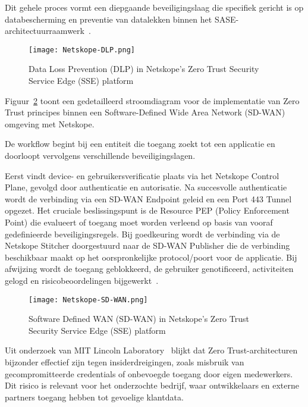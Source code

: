 \vspace{2ex}

Dit gehele proces vormt een diepgaande beveiligingslaag die specifiek gericht is op databescherming en preventie van datalekken binnen het SASE-architectuurraamwerk~\autocite{Netskope2024}.
\begin{figure}[h!]
  \centering
  \texttt{[image: Netskope-DLP.png]}
  \caption[Netskope Data Loss Prevention (DLP)]{Data Loss Prevention (DLP) in Netskope's Zero Trust Security Service Edge (SSE) platform~\autocite{Netskope2024}}
  \label{fig:Netskope-DLP}
\end{figure}

Figuur~\ref{fig:Netskope-SD-WAN} toont een gedetailleerd stroomdiagram voor de implementatie van Zero Trust principes binnen een Software-Defined Wide Area Network (SD-WAN) omgeving met Netskope. 

\vspace{2ex}

De workflow begint bij een entiteit die toegang zoekt tot een applicatie en doorloopt vervolgens verschillende beveiligingslagen. 

\vspace{2ex}

Eerst vindt device- en gebruikersverificatie plaats via het Netskope Control Plane, gevolgd door authenticatie en autorisatie. Na succesvolle authenticatie wordt de verbinding via een SD-WAN Endpoint geleid en een Port 443 Tunnel opgezet. Het cruciale beslissingspunt is de Resource PEP (Policy Enforcement Point) die evalueert of toegang moet worden verleend op basis van vooraf gedefinieerde beveiligingsregels. Bij goedkeuring wordt de verbinding via de Netskope Stitcher doorgestuurd naar de SD-WAN Publisher die de verbinding beschikbaar maakt op het oorspronkelijke protocol/poort voor de applicatie. Bij afwijzing wordt de toegang geblokkeerd, de gebruiker genotificeerd, activiteiten gelogd en risicobeoordelingen bijgewerkt~\autocite{Netskope2024}.
\begin{figure}[h!]
  \centering
  \texttt{[image: Netskope-SD-WAN.png]}
  \caption[Netskope Software Defined WAN (SD-WAN)]{Software Defined WAN (SD-WAN) in Netskope's Zero Trust Security Service Edge (SSE) platform~\autocite{Netskope2024}}
  \label{fig:Netskope-SD-WAN}
\end{figure}

\vspace{2ex}

Uit onderzoek van MIT Lincoln Laboratory~\autocite{MIT2022} blijkt dat Zero Trust-architecturen bijzonder effectief zijn tegen insiderdreigingen, zoals misbruik van gecompromitteerde credentials of onbevoegde toegang door eigen medewerkers. 
Dit risico is relevant voor het onderzochte bedrijf, waar ontwikkelaars en externe partners toegang hebben tot gevoelige klantdata. 

